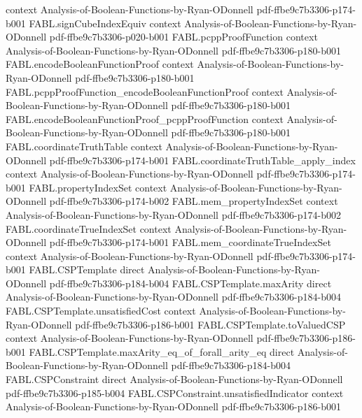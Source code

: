 \begin{theorem}
  {context}
  {Analysis-of-Boolean-Functions-by-Ryan-ODonnell}
  {pdf-ffbe9c7b3306-p174-b001}
\proofstep
  {FABL.signCubeIndexEquiv}
  {context}
  {Analysis-of-Boolean-Functions-by-Ryan-ODonnell}
  {pdf-ffbe9c7b3306-p020-b001}
\proofstep
  {FABL.pcppProofFunction}
  {context}
  {Analysis-of-Boolean-Functions-by-Ryan-ODonnell}
  {pdf-ffbe9c7b3306-p180-b001}
\proofstep
  {FABL.encodeBooleanFunctionProof}
  {context}
  {Analysis-of-Boolean-Functions-by-Ryan-ODonnell}
  {pdf-ffbe9c7b3306-p180-b001}
\proofstep
  {FABL.pcppProofFunction_encodeBooleanFunctionProof}
  {context}
  {Analysis-of-Boolean-Functions-by-Ryan-ODonnell}
  {pdf-ffbe9c7b3306-p180-b001}
\proofstep
  {FABL.encodeBooleanFunctionProof_pcppProofFunction}
  {context}
  {Analysis-of-Boolean-Functions-by-Ryan-ODonnell}
  {pdf-ffbe9c7b3306-p180-b001}
\proofstep
  {FABL.coordinateTruthTable}
  {context}
  {Analysis-of-Boolean-Functions-by-Ryan-ODonnell}
  {pdf-ffbe9c7b3306-p174-b001}
\proofstep
  {FABL.coordinateTruthTable_apply_index}
  {context}
  {Analysis-of-Boolean-Functions-by-Ryan-ODonnell}
  {pdf-ffbe9c7b3306-p174-b001}
\proofstep
  {FABL.propertyIndexSet}
  {context}
  {Analysis-of-Boolean-Functions-by-Ryan-ODonnell}
  {pdf-ffbe9c7b3306-p174-b002}
\proofstep
  {FABL.mem_propertyIndexSet}
  {context}
  {Analysis-of-Boolean-Functions-by-Ryan-ODonnell}
  {pdf-ffbe9c7b3306-p174-b002}
\proofstep
  {FABL.coordinateTrueIndexSet}
  {context}
  {Analysis-of-Boolean-Functions-by-Ryan-ODonnell}
  {pdf-ffbe9c7b3306-p174-b001}
\proofstep
  {FABL.mem_coordinateTrueIndexSet}
  {context}
  {Analysis-of-Boolean-Functions-by-Ryan-ODonnell}
  {pdf-ffbe9c7b3306-p174-b001}
\proofstep
  {FABL.CSPTemplate}
  {direct}
  {Analysis-of-Boolean-Functions-by-Ryan-ODonnell}
  {pdf-ffbe9c7b3306-p184-b004}
\proofstep
  {FABL.CSPTemplate.maxArity}
  {direct}
  {Analysis-of-Boolean-Functions-by-Ryan-ODonnell}
  {pdf-ffbe9c7b3306-p184-b004}
\proofstep
  {FABL.CSPTemplate.unsatisfiedCost}
  {context}
  {Analysis-of-Boolean-Functions-by-Ryan-ODonnell}
  {pdf-ffbe9c7b3306-p186-b001}
\proofstep
  {FABL.CSPTemplate.toValuedCSP}
  {context}
  {Analysis-of-Boolean-Functions-by-Ryan-ODonnell}
  {pdf-ffbe9c7b3306-p186-b001}
\proofstep
  {FABL.CSPTemplate.maxArity_eq_of_forall_arity_eq}
  {direct}
  {Analysis-of-Boolean-Functions-by-Ryan-ODonnell}
  {pdf-ffbe9c7b3306-p184-b004}
\proofstep
  {FABL.CSPConstraint}
  {direct}
  {Analysis-of-Boolean-Functions-by-Ryan-ODonnell}
  {pdf-ffbe9c7b3306-p185-b004}
\proofstep
  {FABL.CSPConstraint.unsatisfiedIndicator}
  {context}
  {Analysis-of-Boolean-Functions-by-Ryan-ODonnell}
  {pdf-ffbe9c7b3306-p186-b001}

\end{theorem}
